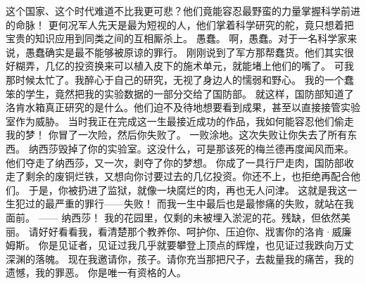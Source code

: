 \documentclass[openany]{book}
\begin{document}
\begin{dialogue}
     这个国家、这个时代难道不比我更可悲？他们竟能容忍最野蛮的力量掌握科学前进的命脉！
     更何况军人先天是最为短视的人，他们掌着科学研究的舵，竟只想着把宝贵的知识应用到同类之间的互相厮杀上。
     愚蠢。
     啊，愚蠢。对于一名科学家来说，愚蠢确实是最不能够被原谅的罪行。
     刚刚说到了军方那帮蠢货。他们其实很好糊弄，几亿的投资换来可以植入皮下的施术单元，就能堵上他们的嘴了。
     可我那时候太忙了。我醉心于自己的研究，无视了身边人的懦弱和野心。
     我的一个蠢笨的学生，竟然把我的实验数据的一部分交给了国防部。
     就这样，国防部知道了洛肯水箱真正研究的是什么。他们迫不及待地想要看到成果，甚至以直接接管实验室作为威胁。
     当时我正在完成这一生最接近成功的作品，我如何能容忍他们偷走我的梦！
     你冒了一次险，然后你失败了。
     一败涂地。这次失败让你失去了所有东西。
     纳西莎毁掉了你的实验室。这没什么，可是那该死的梅兰德再度闻风而来。他们夺走了纳西莎，又一次，剥夺了你的梦想。
     你成了一具行尸走肉，国防部收走了剩余的废铜烂铁，又想向你讨要过去的几亿投资。你还不上，也拒绝再配合他们。
     于是，你被扔进了监狱，就像一块腐烂的肉，再也无人问津。
     这就是我这一生犯过的最严重的罪行——失败！
     而我一生中最后也是最惨痛的失败，就站在我面前。
     ——
     纳西莎！
     我的花园里，仅剩的未被埋入淤泥的花。残缺，但依然美丽。
     请好好看看我，看清楚那个教养你、呵护你、压迫你、戕害你的洛肯·威廉姆斯。
     你是见证者，见证过我几乎就要攀登上顶点的辉煌，也见证过我跌向万丈深渊的落魄。
     现在我邀请你，孩子。请你充当那把尺子，去裁量我的痛苦，我的遗憾，我的罪恶。
     你是唯一有资格的人。
\end{dialogue}
\end{document}

